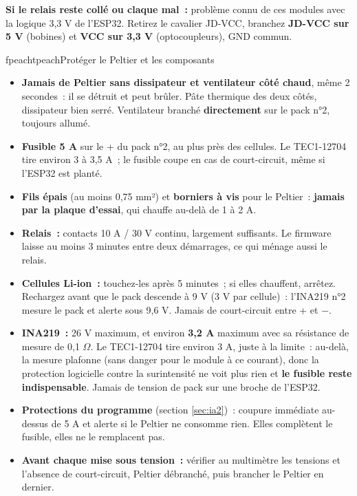 \textbf{Si le relais reste collé ou claque mal~:} problème connu de ces modules avec la logique 3,3 V de l'ESP32. Retirez le cavalier JD-VCC, branchez \textbf{JD-VCC sur 5 V} (bobines) et \textbf{VCC sur 3,3 V} (optocoupleurs), GND commun.

\begin{tbox}{fpeach}{tpeach}{Protéger le Peltier et les composants}
\begin{itemize}[nosep]
  \item \textbf{Jamais de Peltier sans dissipateur et ventilateur côté chaud}, même 2 secondes~: il se détruit et peut brûler. Pâte thermique des deux côtés, dissipateur bien serré. Ventilateur branché \textbf{directement} sur le pack n°2, toujours allumé.
  \item \textbf{Fusible 5 A} sur le + du pack n°2, au plus près des cellules. Le TEC1-12704 tire environ 3 à 3,5 A~; le fusible coupe en cas de court-circuit, même si l'ESP32 est planté.
  \item \textbf{Fils épais} (au moins 0,75 mm²) et \textbf{borniers à vis} pour le Peltier~: \textbf{jamais par la plaque d'essai}, qui chauffe au-delà de 1 à 2 A.
  \item \textbf{Relais~:} contacts 10 A / 30 V continu, largement suffisants. Le firmware laisse au moins 3 minutes entre deux démarrages, ce qui ménage aussi le relais.
  \item \textbf{Cellules Li-ion~:} touchez-les après 5 minutes~; si elles chauffent, arrêtez. Rechargez avant que le pack descende à 9 V (3 V par cellule)~: l'INA219 n°2 mesure le pack et alerte sous 9,6 V. Jamais de court-circuit entre + et $-$.
  \item \textbf{INA219~:} 26 V maximum, et environ \textbf{3,2 A} maximum avec sa résistance de mesure de 0,1 $\Omega$. Le TEC1-12704 tire environ 3 A, juste à la limite~: au-delà, la mesure plafonne (sans danger pour le module à ce courant), donc la protection logicielle contre la surintensité ne voit plus rien et \textbf{le fusible reste indispensable}. Jamais de tension de pack sur une broche de l'ESP32.
  \item \textbf{Protections du programme} (section \ref{sec:ia2})~: coupure immédiate au-dessus de 5 A et alerte si le Peltier ne consomme rien. Elles complètent le fusible, elles ne le remplacent pas.
  \item \textbf{Avant chaque mise sous tension~:} vérifier au multimètre les tensions et l'absence de court-circuit, Peltier débranché, puis brancher le Peltier en dernier.
\end{itemize}
\end{tbox}

